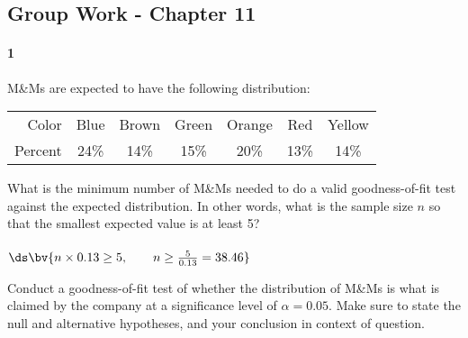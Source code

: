 \documentclass{article}
\begin{document}
\begin{flushleft}
\section*{Group Work - Chapter 11}
\paragraph{1} M\&Ms are expected to have the following distribution:\\
\smallskip
{\centering
\begin{tabular}{r | c c c c c c }
Color & Blue & Brown & Green & Orange & Red & Yellow\\
Percent & 24\% & 14\% & 15\% & 20\% & 13\% & 14\% 
\end{tabular}
\par} 
\begin{enumalpha}
\item What is the minimum number of M\&Ms needed to do a valid goodness-of-fit test against the expected distribution. In other words, what is the sample size $n$ so that the smallest expected value is at least 5?\\
\medskip
{}\\
\medskip
$\ds\bv{n \times 0.13 \ge 5, \qquad n \ge \frac 5 {0.13} = 38.46}$\\
\medskip
{}
\vspace{.5in}
\item Conduct a goodness-of-fit test of whether the distribution of M\&Ms is what is claimed by the company at a significance level of $\alpha=0.05$. Make sure to state the null and alternative hypotheses, and your conclusion in context of question.\\
\medskip
{}\\
\medskip
{}
\end{enumalpha}



\newpage

\end{flushleft}
\end{document}
